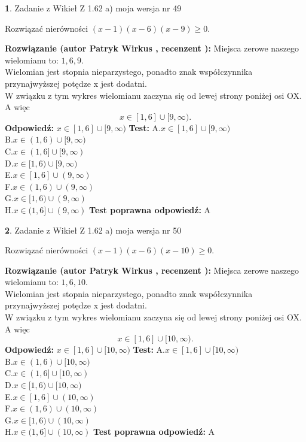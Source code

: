 \documentclass[12pt, a4paper]{article}
\theoremstyle{definition} %
\newtheorem{zad}{}
\newcommand{\zadStart}[1]{\begin{zad}#1\newline}
\newcommand{\zadStop}{\end{zad}}
\newcommand{\rozwStart}[2]{\noindent \textbf{Rozwiązanie (autor #1 , recenzent #2): }\newline}
\newcommand{\rozwStop}{\newline}
\newcommand{\odpStart}{\noindent \textbf{Odpowiedź:}\newline}
\newcommand{\odpStop}{\newline}
\newcommand{\testStart}{\noindent \textbf{Test:}\newline}
\newcommand{\testStop}{\newline}
\newcommand{\kluczStart}{\noindent \textbf{Test poprawna odpowiedź:}\newline}
\newcommand{\kluczStop}{\newline}
\begin{document}
\zadStart{Zadanie z Wikieł Z 1.62 a) moja wersja nr 49}

Rozwiązać nierówności $(x-1)(x-6)(x-9)\ge0$.
\zadStop
\rozwStart{Patryk Wirkus}{}
Miejsca zerowe naszego wielomianu to: $1, 6, 9$.\\
Wielomian jest stopnia nieparzystego, ponadto znak współczynnika przy\linebreak najwyższej potędze x jest dodatni.\\ W związku z tym wykres wielomianu zaczyna się od lewej strony poniżej osi OX. A więc $$x \in [1,6] \cup [9,\infty).$$
\rozwStop
\odpStart
$x \in [1,6] \cup [9,\infty)$
\odpStop
\testStart
A.$x \in [1,6] \cup [9,\infty)$\\
B.$x \in (1,6) \cup [9,\infty)$\\
C.$x \in (1,6] \cup [9,\infty)$\\
D.$x \in [1,6) \cup [9,\infty)$\\
E.$x \in [1,6] \cup (9,\infty)$\\
F.$x \in (1,6) \cup (9,\infty)$\\
G.$x \in [1,6) \cup (9,\infty)$\\
H.$x \in (1,6] \cup (9,\infty)$
\testStop
\kluczStart
A
\kluczStop



\zadStart{Zadanie z Wikieł Z 1.62 a) moja wersja nr 50}

Rozwiązać nierówności $(x-1)(x-6)(x-10)\ge0$.
\zadStop
\rozwStart{Patryk Wirkus}{}
Miejsca zerowe naszego wielomianu to: $1, 6, 10$.\\
Wielomian jest stopnia nieparzystego, ponadto znak współczynnika przy\linebreak najwyższej potędze x jest dodatni.\\ W związku z tym wykres wielomianu zaczyna się od lewej strony poniżej osi OX. A więc $$x \in [1,6] \cup [10,\infty).$$
\rozwStop
\odpStart
$x \in [1,6] \cup [10,\infty)$
\odpStop
\testStart
A.$x \in [1,6] \cup [10,\infty)$\\
B.$x \in (1,6) \cup [10,\infty)$\\
C.$x \in (1,6] \cup [10,\infty)$\\
D.$x \in [1,6) \cup [10,\infty)$\\
E.$x \in [1,6] \cup (10,\infty)$\\
F.$x \in (1,6) \cup (10,\infty)$\\
G.$x \in [1,6) \cup (10,\infty)$\\
H.$x \in (1,6] \cup (10,\infty)$
\testStop
\kluczStart
A
\kluczStop
\end{document}
